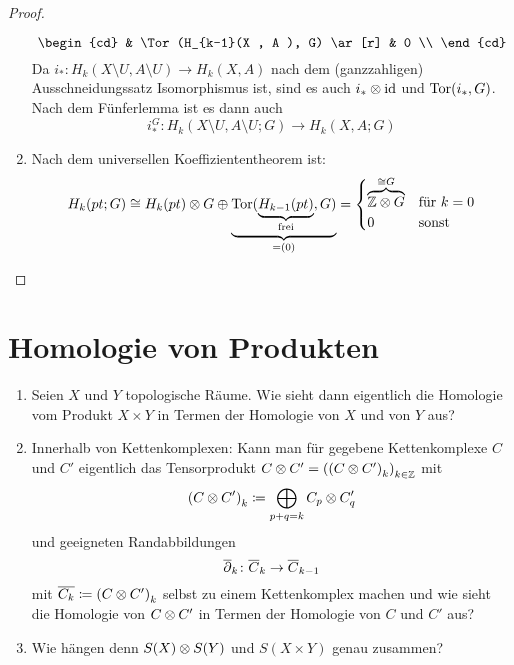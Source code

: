 \begin{proof}
\begin{enumerate}
\begin{equation*}
\begin{cd}
          & \Tor(H_{k-1}(X , A ), G) \ar[r]
          & 0 \\
        \end{cd}
      \end{equation*}
      Da $i_* \colon H_k(X \setminus U, A \setminus U) \to H_k(X,A)$ nach dem (ganzzahligen) Ausschneidungssatz Isomorphismus ist, sind es auch $i_* \otimes \operatorname{id}$ und $\mathrm{Tor}(i_*, G)$.
      Nach dem Fünferlemma ist es dann auch
      \begin{equation*}
        i_*^G \colon H_k(X \setminus U, A \setminus U; G) \to H_k(X,A;G)
      \end{equation*}
    \item
      Nach dem universellen Koeffiziententheorem ist:
      \begin{equation*}
        H_k(pt; G) \cong H_k(pt) \otimes G \oplus \underbrace{\mathrm{Tor}(\underbrace{H_{k-1}(pt)}_{\text{frei}}, G)}_{= (0)} =
        \begin{cases}
          \overbrace{\mathbb{Z} \otimes G}^{\cong G} & \text{für $k = 0$} \\
          0 & \text{sonst}
        \end{cases}
      \end{equation*}
  \end{enumerate}
\end{proof}


\section{Homologie von Produkten}

\begin{motivation}
  \begin{enumerate}
    \item
      Seien $X$ und $Y$ topologische Räume.
      Wie sieht dann eigentlich die Homologie vom Produkt $X \times Y$ in Termen der Homologie von $X$ und von $Y$ aus?
    \item
      Innerhalb von Kettenkomplexen:
      Kann man für gegebene Kettenkomplexe $C$ und $C'$ eigentlich das Tensorprodukt $C \otimes C' = {({(C \otimes C')}_{k})}_{k \in \mathbb{Z}}$ mit
      \begin{equation*}
        {(C \otimes C')}_k \coloneqq \bigoplus_{p+q = k} C_p \otimes C'_q
      \end{equation*}
      und geeigneten Randabbildungen
      \begin{equation*}
        \overline{\partial}_k \colon \overline{C}_k \to \overline{C}_{k-1}
      \end{equation*}
      mit $\overline{C_k} \coloneqq {(C \otimes C')}_k$ selbst zu einem Kettenkomplex machen und wie sieht die Homologie von $C \otimes C'$ in Termen der Homologie von $C$ und $C'$ aus?
    \item
      Wie hängen denn $S(X) \otimes S(Y)$ und $S(X \times Y)$ genau zusammen?
  \end{enumerate}
\end{motivation}

